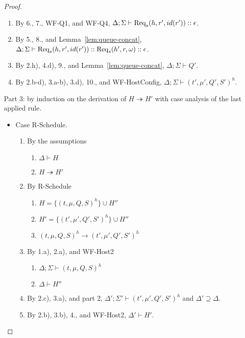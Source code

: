 \begin{proof}
\begin{itemize}
\begin{enumerate}
\item By 6., 7., WF-Q1, and WF-Q4, $\Delta ; \Sigma \vdash {\textrm{Req}_s(h, r', id(r'))} :: \epsilon$.
\item By 5., 8., and Lemma~\ref{lem:queue-concat}, $\Delta ; \Sigma \vdash {\textrm{Req}_s(h, r', id(r'))} :: {\textrm{Req}_s(h', r, \omega)} :: \epsilon$.
\item By 2.h), 4.d), 9., and Lemma~\ref{lem:queue-concat}, $\Delta ; \Sigma \vdash Q'$.
\item By 2.b-d), 3.a-b), 3.d), 10., and WF-HostConfig, $\Delta ; \Sigma \vdash (t', \mu', Q', S')^h$.
\end{enumerate}

\end{itemize}

Part 3: by induction on the derivation of $H \twoheadrightarrow H'$ with case analysis of the last applied rule.

\begin{itemize}
\item Case R-Schedule.
\begin{enumerate}
\item By the assumptions
  \begin{enumerate}[label=(\alph*)]
  \item $\Delta \vdash H$
  \item $H \twoheadrightarrow H'$
  \end{enumerate}
\item By R-Schedule
  \begin{enumerate}[label=(\alph*)]
  \item $H = \{ (t, \mu, Q, S)^h \} \cup H''$
  \item $H' = \{ (t', \mu', Q', S')^h \} \cup H''$
  \item $(t, \mu, Q, S)^h \longrightarrow (t', \mu', Q', S')^h$
  \end{enumerate}
\item By 1.a), 2.a), and WF-Host2
  \begin{enumerate}[label=(\alph*)]
  \item $\Delta ; \Sigma \vdash (t, \mu, Q, S)^h$
  \item $\Delta \vdash H''$
  \end{enumerate}
\item By 2.c), 3.a), and part 2, $\Delta' ; \Sigma' \vdash (t', \mu', Q', S')^h$ and $\Delta' \supseteq \Delta$.
\item By 2.b), 3.b), 4., and WF-Host2, $\Delta' \vdash H'$.
\end{enumerate}


\end{itemize}
\end{proof}
